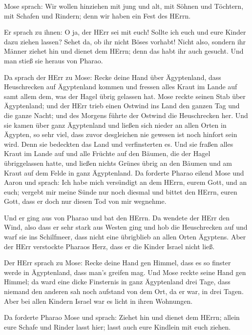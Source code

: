  Mose sprach: Wir wollen hinziehen mit jung und alt, mit
Söhnen und Töchtern, mit Schafen und Rindern; denn wir haben ein Fest
des HErrn.

 Er sprach zu ihnen: O ja, der HErr sei mit euch! Sollte
ich euch und eure Kinder dazu ziehen lassen? Sehet da, ob ihr nicht
Böses vorhabt!  Nicht also, sondern ihr Männer ziehet hin
und dienet dem HErrn; denn das habt ihr auch gesucht. Und man stieß sie
heraus von Pharao.

 Da sprach der HErr zu Mose: Recke deine Hand über
Ägyptenland, dass Heuschrecken auf Ägyptenland kommen und fressen alles
Kraut im Lande auf samt allem dem, was der Hagel übrig gelassen hat.
 Mose reckte seinen Stab über Ägyptenland; und der HErr
trieb einen Ostwind ins Land den ganzen Tag und die ganze Nacht; und des
Morgens führte der Ostwind die Heuschrecken her.  Und sie
kamen über ganz Ägyptenland und ließen sich nieder an allen Orten in
Ägypten, so sehr viel, dass zuvor desgleichen nie gewesen ist noch
hinfort sein wird.  Denn sie bedeckten das Land und
verfinsterten es. Und sie fraßen alles Kraut im Lande auf und alle
Früchte auf den Bäumen, die der Hagel übriggelassen hatte, und ließen
nichts Grünes übrig an den Bäumen und am Kraut auf dem Felde in ganz
Ägyptenland.  Da forderte Pharao eilend Mose und Aaron und
sprach: Ich habe mich versündigt an dem HErrn, eurem Gott, und an euch;
 vergebt mir meine Sünde nur noch diesmal und bittet den
HErrn, euren Gott, dass er doch nur diesen Tod von mir wegnehme.

 Und er ging aus von Pharao und bat den HErrn.
 Da wendete der HErr den Wind, also dass er sehr stark aus
Westen ging und hob die Heuschrecken auf und warf sie ins Schilfmeer,
dass nicht eine übrigblieb an allen Orten Ägyptens.  Aber
der HErr verstockte Pharaos Herz, dass er die Kinder Israel nicht ließ.

 Der HErr sprach zu Mose: Recke deine Hand gen Himmel, dass
es so finster werde in Ägyptenland, dass man's greifen mag.
 Und Mose reckte seine Hand gen Himmel; da ward eine dicke
Finsternis in ganz Ägyptenland drei Tage,  dass niemand den
anderen sah noch aufstand von dem Ort, da er war, in drei Tagen. Aber
bei allen Kindern Israel war es licht in ihren Wohnungen.

 Da forderte Pharao Mose und sprach: Ziehet hin und dienet
dem HErrn; allein eure Schafe und Rinder lasst hier; lasst auch eure
Kindlein mit euch ziehen.

